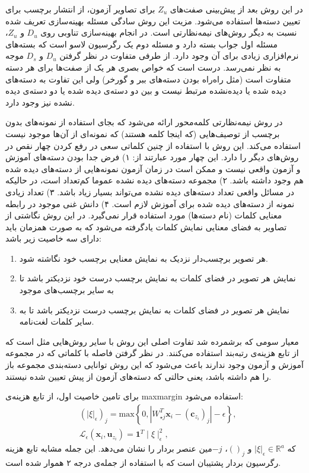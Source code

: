 در این روش بعد از پیش‌بینی صفت‌های $Z_u$ برای تصاویر آزمون، از انتشار برچسب برای تعیین دسته‌ها استفاده می‌شود. مزیت این روش سادگی مسئله بهینه‌سازی تعریف شده نسبت به دیگر روش‌های نیمه‌نظارتی است. در انجام بهینه‌سازی تناوبی روی $D_u$ و $Z_u$، مسئله اول جواب بسته دارد و مسئله دوم یک رگرسیون لاسو است که بسته‌های نرم‌افزاری زیادی برای آن وجود دارد. از طرفی متفاوت در نظر گرفتن $D_u$ و $D_s$ موجه به نظر نمی‌رسد. درست است که خواص بصری هر یک از صفت‌ها برای هر دسته متفاوت است (مثل راه‌راه  بودن دسته‌های ببر و گورخر) ولی این تفاوت به دسته‌های دیده شده یا دیده‌نشده مرتبط نیست و بین دو دسته‌ی دیده شده یا دو دسته‌ی دیده نشده نیز وجود دارد.

در \cite{Fu2016} روش نیمه‌نظارتی کلمه‌محور   ارائه می‌شود که بجای استفاده از نمونه‌های بدون برچسب از توصیف‌هایی (که اینجا کلمه هستند) که نمونه‌ای از آن‌ها موجود نیست استفاده می‌کند. این روش با استفاده از چنین کلماتی سعی در رفع کردن چهار نقص در روش‌های دیگر را دارد. این چهار مورد عبارتند از: ۱) فرض جدا بودن دسته‌های آموزش و آزمون واقعی نیست و ممکن است در زمان آزمون نمونه‌هایی از دسته‌های دیده شده هم وجود داشته باشد. ۲) مجموعه دسته‌های دیده نشده عموما کم‌تعداد است، در حالیکه در مسائل واقعی تعداد دسته‌های دیده نشده می‌تواند بسیار زیاد باشد. ۳) تعداد زیادی نمونه از دسته‌های دیده شده برای آموزش لازم است. ۴) دانش غنی موجود در رابطه معنایی کلمات (نام دسته‌ها) مورد استفاده قرار نمی‌گیرد. 
در این روش نگاشتی از تصاویر به فضای معنایی نمایش کلمات یادگرفته می‌شود که به صورت همزمان باید دارای سه خاصیت زیر باشد:
\begin{enumerate}
\item هر تصویر برچسب‌دار نزدیک به نمایش معنایی برچسب خود نگاشته شود.
\item 
نمایش هر تصویر در فضای کلمات به نمایش برچسب درست خود نزدیکتر باشد تا به سایر برچسب‌های موجود
\item 
نمایش هر تصویر در فضای کلمات به نمایش برچسب درست نزدیکتر باشد تا به سایر کلمات لغت‌نامه.
\end{enumerate}
معیار سومی که برشمرده شد تفاوت اصلی این روش با سایر روش‌هایی مثل
\cite{devise}
است که از تابع هزینه‌ی رتبه‌بند استفاده می‌کنند. در نظر گرفتن فاصله با کلماتی که در مجموعه آموزش و آزمون وجود ندارند باعث می‌شود که این روش توانایی دسته‌بندی مجموعه باز 
 را هم داشته باشد، یعنی حالتی که دسته‌های آزمون از پیش تعیین شده نیستند.
  
 برای تامین خاصیت اول، از تابع هزینه‌ی \gls{maxmargin} استفاده می‌شود:
\begin{align}
\label{eq:svr}
&\left(|\xi|_{\epsilon}\right)_{j} =\mathrm{max}\left\{ 0,|W_{\star j}^{T}\mathbf{x}_{i}-\left(\mathbf{\mathbf{c}}_{z_{i}}\right)_{j}|-\epsilon\right\}, \\
&\mathcal{L}_{\epsilon}\left(\mathbf{x}_{i},\mathbf{u}_{z_{i}}\right) =\mathbf{1}^{T}\mid\xi\mid_{\epsilon}^{2},
\end{align}
که
 $|\xi|_{\epsilon}\in\mathbb{R}^{a}$
و 
$()_j$،
$-j$مین 
عنصر بردار را نشان می‌دهد. این جمله  مشابه تابع هزینه رگرسیون بردار پشتیبان 
  است که با استفاده از جمله‌ی درجه ۲ هموار شده است.
  
